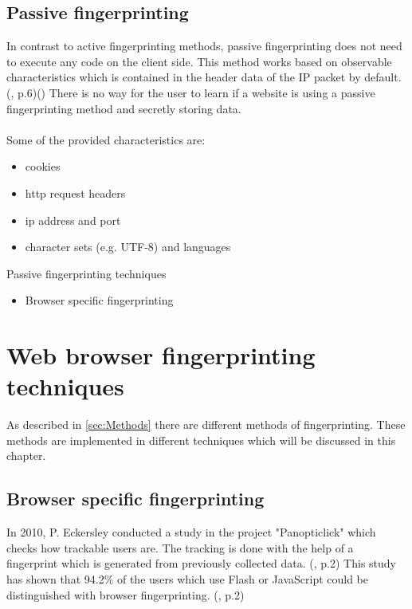 \subsection{Passive fingerprinting}
In contrast to active fingerprinting methods, passive fingerprinting does not need to execute any code on the client side. This method works based on observable characteristics which is contained in the header data of the IP packet by default. (\textcite{doty18}, p.6)(\textcite{web17}) There is no way for the user to learn if a website is using a passive fingerprinting method and secretly storing data.\\\\
Some of the provided characteristics are:
\begin{itemize}
	\item cookies
	\item http request headers
	\item ip address and port
	\item character sets (e.g. UTF-8) and languages\\
\end{itemize}
Passive fingerprinting techniques
\begin{itemize}
	\item Browser specific fingerprinting
\end{itemize}

\section{Web browser fingerprinting techniques}
As described in \autoref{sec:Methods} there are different methods of fingerprinting. These methods are implemented in different techniques which will be discussed in this chapter.
\subsection{Browser specific fingerprinting}
In 2010, P. Eckersley conducted a study in the project "Panopticlick" which checks how trackable users are. The tracking is done with the help of a fingerprint which is generated from previously collected data. (\textcite{upi15}, p.2) This study has shown that 94.2\% of the users which use Flash or JavaScript could be distinguished with browser fingerprinting. (\textcite{eckersley10}, p.2)
